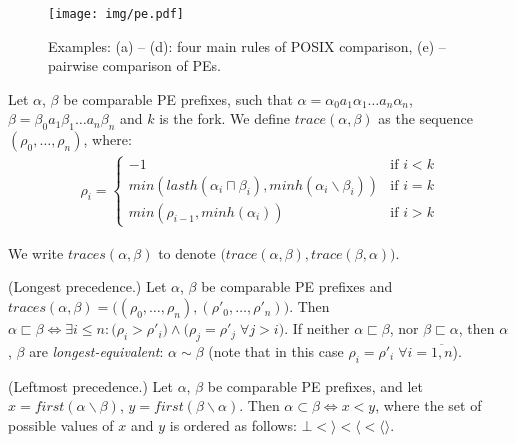 \documentclass[AMA,STIX1COL]{WileyNJD-v2}
\newcommand{\Xl}{\langle}
\newcommand{\Xr}{\rangle}
\newcommand{\Xm}{\langle\!\rangle}
\begin{document}
\begin{figure}
\texttt{[image: img/pe.pdf]}
\vspace{-2em}
\caption{
Examples: (a) -- (d): four main rules of POSIX comparison,
(e) -- pairwise comparison of PEs.
}\label{fig_pe}
\end{figure}

    \begin{definition}
    \label{def_traces}
    Let $\alpha$, $\beta$ be comparable PE prefixes, such that
    $\alpha = \alpha_0 a_1 \alpha_1 \dots a_n \alpha_n$,
    $\beta = \beta_0 a_1 \beta_1 \dots a_n \beta_n$ and $k$ is the fork.
    We define $trace (\alpha, \beta)$ as the sequence $(\rho_0, \dots, \rho_n)$, where:
    \begin{align*}
    \rho_i = \begin{cases}
        -1 &\text{if } i < k \\[-0.2em]
        min (lasth (\alpha_i \sqcap \beta_i), minh(\alpha_i \backslash \beta_i)) &\text{if } i = k \\[-0.2em]
        min (\rho_{i-1}, minh(\alpha_i)) &\text{if } i > k
    \end{cases}
    \end{align*}

    We write $traces(\alpha, \beta)$ to denote $\big( trace (\alpha, \beta), trace (\beta, \alpha) \big)$.
    \end{definition}

    \begin{definition}\label{prec1}
    (Longest precedence.)
    Let $\alpha$, $\beta$ be comparable PE prefixes and
    $traces(\alpha, \beta) = \big( (\rho_0, \dots, \rho_n), (\rho'_0, \dots, \rho'_n) \big)$.
    Then $\alpha \sqsubset \beta \Leftrightarrow \exists i \leq n:
        \big( \rho_i > \rho'_i \big) \wedge
        \big( \rho_j = \rho'_j \; \forall j > i \big)$.
    If neither $\alpha \sqsubset \beta$, nor $\beta \sqsubset \alpha$,
    then $\alpha$, $\beta$ are \emph{longest-equivalent}: $\alpha \sim \beta$
    (note that in this case $\rho_i = \rho'_i \; \forall i = \overline {1, n}$).
    \end{definition}

    \begin{definition}\label{prec2}
    (Leftmost precedence.)
    Let $\alpha$, $\beta$ be comparable PE prefixes, and let
    $x = first (\alpha \backslash \beta)$,
    $y = first (\beta \backslash \alpha)$.
    Then $\alpha \subset \beta \Leftrightarrow x < y$, where
    the set of possible values of $x$ and $y$ is ordered as follows:
    $\bot < \Xr < \Xl < \Xm$.
    \end{definition}
\end{document}
